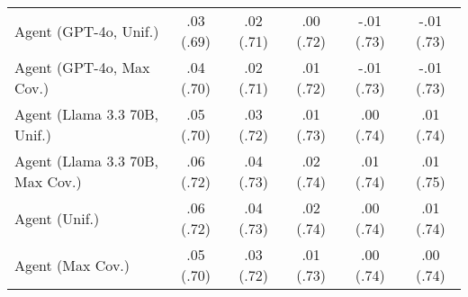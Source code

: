 \begin{table}[h!]
\begin{tabular}{lccccc}
    Agent (GPT-4o, Unif.) & .03 {\small (.69)} & .02 {\small (.71)} & .00 {\small (.72)} & -.01 {\small (.73)} & -.01 {\small (.73)} \\
    Agent (GPT-4o, Max Cov.) & .04 {\small (.70)} & .02 {\small (.71)} & .01 {\small (.72)} & -.01 {\small (.73)} & -.01 {\small (.73)} \\
    Agent (Llama 3.3 70B, Unif.) & .05 {\small (.70)} & .03 {\small (.72)} & .01 {\small (.73)} & .00 {\small (.74)} & .01 {\small (.74)} \\
    Agent (Llama 3.3 70B, Max Cov.) & .06 {\small (.72)} & .04 {\small (.73)} & .02 {\small (.74)} & \cellcolor{bronze!30}.01 {\small (.74)} & \cellcolor{bronze!30}.01 {\small (.75)} \\
    Agent (Unif.) & .06 {\small (.72)} & .04 {\small (.73)} & .02 {\small (.74)} & .00 {\small (.74)} & .01 {\small (.74)} \\
    Agent (Max Cov.) & .05 {\small (.70)} & .03 {\small (.72)} & .01 {\small (.73)} & .00 {\small (.74)} & .00 {\small (.74)} \\
    \bottomrule
    \end{tabular}
\end{table}
